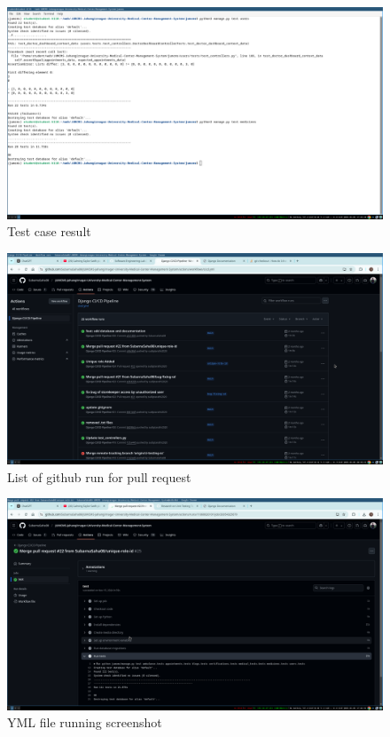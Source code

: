 \documentclass[a4paper,12pt]{article}
\begin{document}
\begin{figure}[H]
    \centering
    \includegraphics[width=1\textwidth]{images/TDD3.png}
    \caption{Test case result}
    \label{fig:tdd3}
\end{figure}
\begin{figure}[H]
    \centering
    \includegraphics[width=1\textwidth]{images/CI.png}
    \caption{List of github run for pull request}
    \label{fig:ci}
\end{figure}


\begin{figure}[H]
    \centering
    \includegraphics[width=1\textwidth]{images/TDD4.png}
    \caption{YML file running screenshot}
    \label{fig:tdd4}
\end{figure}
\end{document}
